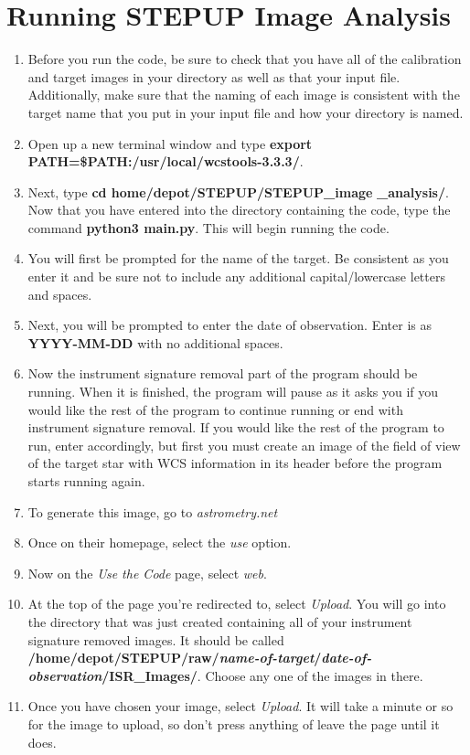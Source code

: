 \documentclass[11pt]{report}
\begin{document}
\chapter{Running STEPUP Image Analysis}
\begin{enumerate}
\item Before you run the code, be sure to check that you have all of the calibration and target images in your directory as well as that your input file. Additionally, make sure that the naming of each image is consistent with the target name that you put in your input file and how your directory is named.
\item Open up a new terminal window and type {\bf export PATH=\$PATH:/usr/local/wcstools-3.3.3/}.
\item Next, type {\bf cd home/depot/STEPUP/STEPUP\_image} {\bf\_analysis/}. Now that you have entered into the directory containing the code, type the command {\bf python3 main.py}. This will begin running the code.
\item You will first be prompted for the name of the target. Be consistent as you enter it and be sure not to include any additional capital/lowercase letters and spaces.
\item Next, you will be prompted to enter the date of observation. Enter is as {\bf YYYY-MM-DD} with no additional spaces.
\item Now the instrument signature removal part of the program should be running. When it is finished, the program will pause as it asks you if you would like the rest of the program to continue running or end with instrument signature removal. If you would like the rest of the program to run, enter accordingly, but first you must create an image of the field of view of the target star with WCS information in its header before the program starts running again.\
\item To generate this image, go to \emph{astrometry.net}
\item Once on their homepage, select the \emph{use} option. 
\item Now on the \emph{Use the Code} page, select \emph{web}.
\item At the top of the page you're redirected to, select \emph{Upload}. You will go into the directory that was just created containing all of your instrument signature removed images. It should be called {\bf /home/depot/STEPUP/raw/\emph{name-of-target}/\emph{date-of-observation}/ISR\_Images/}. Choose any one of the images in there.
\item Once you have chosen your image, select \emph{Upload}. It will take a minute or so for the image to upload, so don't press anything of leave the page until it does.

\end{enumerate}
\end{document}
